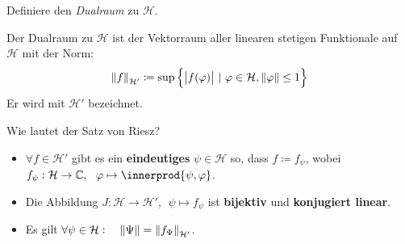 \documentclass[9pt]{article}
\newcommand{\C}[1]{%
	\ifthenelse{\equal{#1}{}}
	{\mathbb{C}}
	{\mathbb{C}^{#1}}}%
\DeclarePairedDelimiter{\innerprod}\langle\rangle
\newcommand{\Hi}{\mathcal{H}}
\newenvironment{field}{}{\newpage}
\newif\ifnote
\newenvironment{note}{\notetrue}{\notefalse}
\newcommand{\localtag}{}
\newcommand{\globaltag}{}
\newcommand{\uuid}{}
\newcommand{\tags}[1]{
    \ifnote 
        \renewcommand{\localtag}{#1}
    \else
        \renewcommand{\globaltag}{#1}
    \fi 
    }
\newcommand{\xplain}[1]{\renewcommand{\uuid}{#1}}
\begin{document}
	\begin{note}
		\xplain{51c21e76-0b2c-472a-86c2-845e67a1b33b}
		\tags{definition, satz, dualraum, 5.2.17, 5.2.18}
		
		\begin{field}  %
			Definiere den \textit{Dualraum} zu $\Hi$.
		\end{field}
		
		\begin{field}  %
			Der Dualraum zu $\Hi$ ist der Vektorraum aller linearen stetigen Funktionale auf $\Hi$
			mit der Norm:
			\begin{equation*}
				\norm{f}_{\Hi'} \coloneqq \sup\qty{\abs{f(\varphi)} \ | \ \varphi \in \Hi, \norm{\varphi}\leq 1}
			\end{equation*}
			Er wird mit $\Hi'$ bezeichnet. 
		\end{field}
		
	\begin{field}  %
		Wie lautet der Satz von Riesz?
	\end{field}
	
	\begin{field}  %
		\begin{itemize}
			\item $\forall f \in \Hi'$ gibt es ein \textbf{eindeutiges} $\psi \in \Hi$ so, dass
			$f \coloneqq f_\psi$, wobei $f_\psi :\Hi \rightarrow \C{}, \ \ \varphi \mapsto \innerprod{\psi,\varphi}$.
			\item Die Abbildung $J : \Hi \rightarrow \Hi', \ \ \psi \mapsto f_\psi$ ist \textbf{bijektiv} und \textbf{konjugiert linear}.
			\item Es gilt $\forall \psi \in \Hi: \quad \norm{\Psi} = \norm{f_\Psi}_{\Hi'}$.
		\end{itemize}
	\end{field}
	\end{note}
\end{document}
